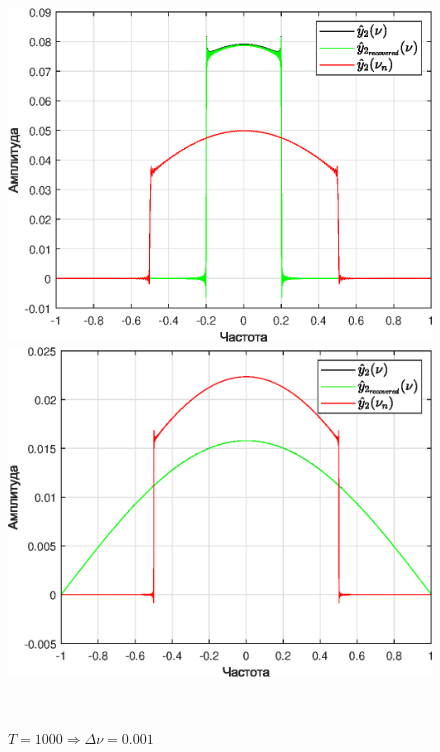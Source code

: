 \documentclass[a4paper]{article}
\begin{document}
\begin{figure}[H]
    \begin{minipage}{0.5\textwidth}
        \centering \includegraphics[width=\textwidth]{graphs2/T_200_dt_0.5_B_1_dv_0.005/func2_image.eps}
        \caption{$T = 200 \Rightarrow \Delta \nu = 0.005$}
    \end{minipage}\hfill
    \begin{minipage}{0.5\textwidth}
        \centering \includegraphics[width=\textwidth]{graphs2/T_1000_dt_0.5_B_1_dv_0.001/func2_image.eps}
        \caption{$T = 1000 \Rightarrow \Delta \nu = 0.001$}
    \end{minipage}\\[1em]
\end{figure}\noindent\
\end{document}
